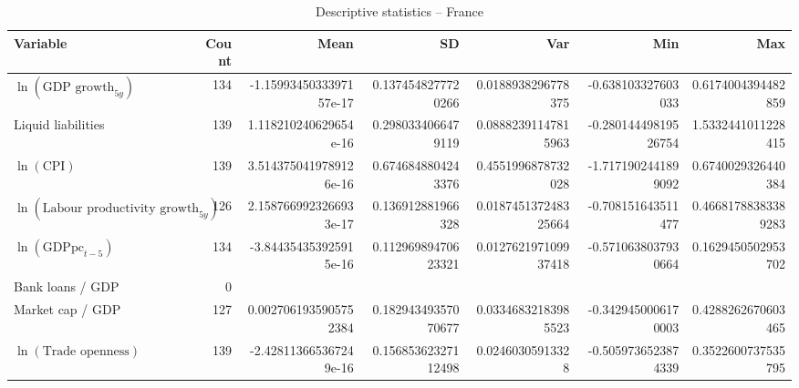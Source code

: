 \begin{table}[!htbp]
\centering
\caption{Descriptive statistics -- France}
\footnotesize
\begin{tabular}{lrrrrrr}
\toprule
Variable & Count & Mean & SD & Var & Min & Max \\
\midrule
$\ln(\text{GDP growth}_{5y})$ & 134 & -1.1599345033397157e-17 & 0.1374548277720266 & 0.0188938296778375 & -0.638103327603033 & 0.6174004394482859 \\
Liquid liabilities & 139 & 1.118210240629654e-16 & 0.2980334066479119 & 0.08882391147815963 & -0.28014449819526754 & 1.5332441011228415 \\
$\ln(\text{CPI})$ & 139 & 3.5143750419789126e-16 & 0.6746848804243376 & 0.4551996878732028 & -1.7171902441899092 & 0.6740029326440384 \\
$\ln(\text{Labour productivity growth}_{5y})$ & 126 & 2.1587669923266933e-17 & 0.136912881966328 & 0.018745137248325664 & -0.708151643511477 & 0.46681788383389283 \\
$\ln(\text{GDPpc}_{t-5})$ & 134 & -3.844354353925915e-16 & 0.11296989470623321 & 0.012762197109937418 & -0.5710638037930664 & 0.1629450502953702 \\
Bank loans / GDP & 0 &  &  &  &  &  \\
Market cap / GDP & 127 & 0.0027061935905752384 & 0.18294349357070677 & 0.03346832183985523 & -0.3429450006170003 & 0.4288262670603465 \\
$\ln(\text{Trade openness})$ & 139 & -2.428113665367249e-16 & 0.15685362327112498 & 0.02460305913328 & -0.5059736523874339 & 0.3522600737535795 \\
\bottomrule
\end{tabular}
\end{table}


